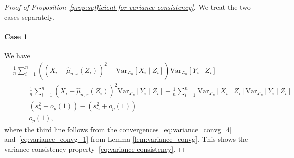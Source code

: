 \documentclass[aos]{imsart}
\theoremstyle{plain}
\theoremstyle{remark}
\newcommand{\V}{\mathrm{Var}}							%
\newcommand{\srx}{X}									%
\newcommand{\srz}{Z}									%
\newcommand{\sry}{Y}									%
\newcommand{\law}{\mathcal L}							%
\begin{document}
\begin{proof}[Proof of Proposition~\ref{prop:sufficient-for-variance-consistency}]

We treat the two cases separately.

\paragraph*{Case 1}
We have
\begin{align*}
&\frac{1}{n} \sum_{i = 1}^n ((\srx_i - \widehat \mu_{n,x}(\srz_i))^2 - \V_{\law_n}[\srx_i \mid \srz_i])\V_{\law_n}[\sry_i\mid\srz_i] \\
&\quad= \frac{1}{n} \sum_{i = 1}^n (\srx_i - \widehat \mu_{n,x}(\srz_i))^2\V_{\law_n}[\sry_i\mid\srz_i] - \frac{1}{n} \sum_{i = 1}^n \V_{\law_n}[\srx_i \mid \srz_i]\V_{\law_n}[\sry_i\mid\srz_i] \\
&\quad= (s^2_n + o_p(1)) - (s^2_n + o_p(1)) \\
&\quad= o_p(1),
\end{align*}
where the third line follows from the convergences~\eqref{eq:variance_convg_4} and~\eqref{eq:variance_convg_1} from Lemma \ref{lem:variance_convg}. This shows the variance consistency property~\eqref{eq:variance-consistency}.


\end{proof}
\end{document}
